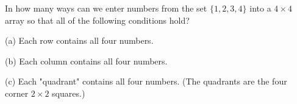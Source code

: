 In how many ways can we enter numbers from the set $\{1,2,3,4\}$ into a $4\times 4$ array so that all of the following conditions hold?

(a) Each row contains all four numbers.

(b) Each column contains all four numbers.

(c) Each "quadrant" contains all four numbers.  (The quadrants are the four corner $2\times 2$ squares.)